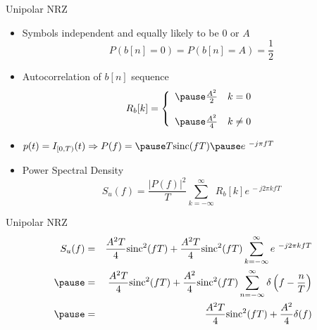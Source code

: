 \documentclass[t]{beamer}
\begin{document}
\begin{frame}{Unipolar NRZ}
  \footnotesize
  \begin{itemize}
    \item Symbols independent and equally likely to be $0$ or $A$
      \begin{equation*}
        P\left(b[n] = 0\right) = P\left(b[n]= A\right) = \frac{1}{2}
      \end{equation*}
    \pause
    \item Autocorrelation of $b[n]$ sequence 
      \begin{equation*}
        R_b[k] = \left\{ 
                    \begin{array}{rr}
                      \pause
                      \frac{A^2}{2} & k = 0 \\
                          & \\
                      \pause
                      \frac{A^2}{4} & k \neq 0 
                    \end{array}
                 \right.
      \end{equation*}
    \pause 
    \item $p(t) = I_{[0,T)}(t)\Rightarrow P(f) = \pause T\text{sinc}(fT)\pause e^{\ -j\pi fT}$
    \pause
    \item Power Spectral Density
      \begin{equation*}
        S_u(f) = \frac{\lvert P(f)\rvert^2}{T}\sum_{k=-\infty}^{\infty} R_b[k] e^{\ -j2\pi kfT}
      \end{equation*}
  \end{itemize}
  \normalsize
\end{frame}

\begin{frame}{Unipolar NRZ}
  \footnotesize
  \begin{eqnarray*}
    S_u(f) & = & \frac{A^2T}{4}\text{sinc}^2(fT) + \frac{A^2T}{4}\text{sinc}^2(fT) \sum_{k=-\infty}^{\infty}  e^{\ -j2\pi kfT} \\
    \pause
           & = & \frac{A^2T}{4}\text{sinc}^2(fT) + \frac{A^2}{4}\text{sinc}^2(fT) \sum_{n=-\infty}^{\infty}  \delta\left(f - \frac{n}{T}\right) \\
    \pause
           & = & \frac{A^2T}{4}\text{sinc}^2(fT) + \frac{A^2}{4} \delta(f) 
  \end{eqnarray*}
  \normalsize
\end{frame}
\end{document}
